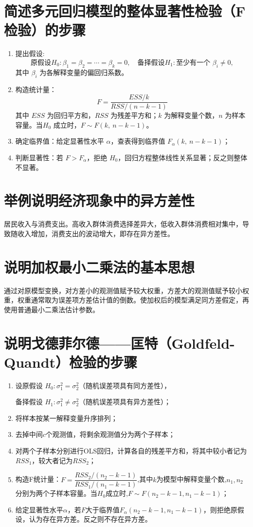 \documentclass{ctexart}
\begin{document}
\section{简述多元回归模型的整体显著性检验（F检验）的步骤}
\begin{enumerate}
\item 提出假设:
$$
\text{原假设}H_0: \beta_1=\beta_2=\cdots=\beta_k=0, \quad \text{备择假设}H_1: \text{至少有一个 } \beta_i \neq 0,
$$
其中 $\beta_i$ 为各解释变量的偏回归系数。

\item 构造统计量：
$$
F = \frac{ESS/k}{RSS/(n-k-1)}
$$
其中 $ESS$ 为回归平方和，$RSS$ 为残差平方和；$k$ 为解释变量个数，$n$ 为样本容量。当$H_0$ 成立时，$F \sim F(k,\ n-k-1)$。

\item 确定临界值：给定显著性水平 $\alpha$，查表得到临界值 $F_\alpha(k,\ n-k-1)$；

\item 判断显著性：若 $F > F_\alpha$，拒绝 $H_0$，回归方程整体线性关系显著；反之则整体不显著。
\end{enumerate}

\section{举例说明经济现象中的异方差性}

居民收入与消费支出。高收入群体消费选择差异大，低收入群体消费相对集中，导致随收入增加，消费支出的波动增大，即存在异方差性。

\section{说明加权最小二乘法的基本思想}

通过对原模型变换，对方差小的观测值赋予较大权重，方差大的观测值赋予较小权重，权重通常取为误差项方差估计值的倒数。使加权后的模型满足同方差假定，再使用普通最小二乘法估计参数。

\section{说明戈德菲尔德——匡特（Goldfeld-Quandt）检验的步骤}
\begin{enumerate}
\item 设原假设 $H_0: \sigma_1^2 = \sigma_2^2$（随机误差项具有同方差性），

备择假设 $H_1: \sigma_1^2 \neq \sigma_2^2$（随机误差项具有异方差性）；

\item 将样本按某一解释变量升序排列；
\item 去掉中间$c$个观测值，将剩余观测值分为两个子样本；
\item 对两个子样本分别进行OLS回归，计算各自的残差平方和，将其中较小者记为$RSS_1$，较大者记为$RSS_2$；
\item 构造F统计量：$F = \dfrac{RSS_2 / (n_2 - k-1)}{RSS_1 / (n_1 - k-1)}$,其中$k$为模型中解释变量个数,$n_1,n_2$分别为两个子样本容量。当$H_0$成立时,$F\sim F(n_2-k-1,n_1-k-1)$；
\item 给定显著性水平$\alpha$，若$F$大于临界值$F_{\alpha}(n_2-k-1,n_1-k-1)$，则拒绝原假设，认为存在异方差。反之则不存在异方差。
\end{enumerate}
\end{document}
